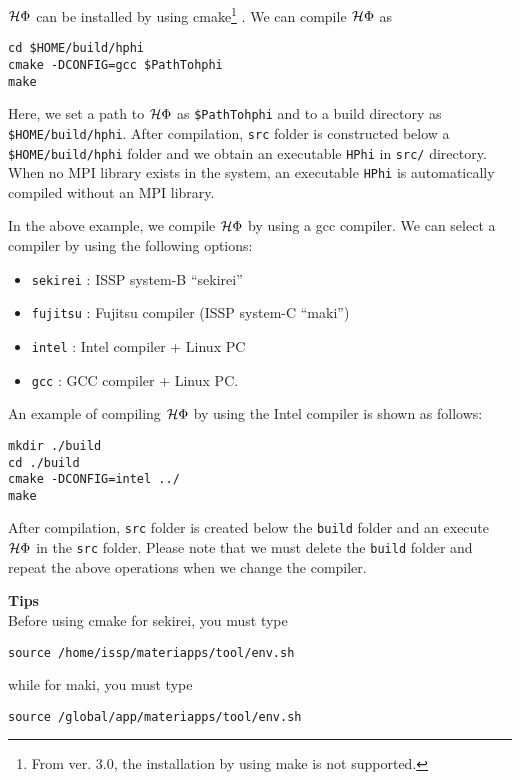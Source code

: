 $\mathcal{H} \Phi$ can be installed by using cmake\footnote{From ver. 3.0, the installation by using make is not supported.}
.
We can compile $\mathcal{H} \Phi$ as
\begin{verbatim}
cd $HOME/build/hphi
cmake -DCONFIG=gcc $PathTohphi
make
\end{verbatim}
Here, we set a path to $\mathcal{H} \Phi$ as \verb|$PathTohphi|
and to a build directory as \verb| $HOME/build/hphi|.
After compilation, \verb|src| folder is constructed below a \verb|$HOME/build/hphi|
folder and we obtain an executable \verb|HPhi| in \verb|src/| directory.
When no MPI library exists in the system, an executable \verb|HPhi|
is automatically compiled without an MPI library.

In the above example,
we compile $\mathcal{H} \Phi$ by using a gcc compiler.
We can select a compiler by using the following options:
\begin{itemize}
\item \verb|sekirei| : ISSP system-B ``sekirei''
\item \verb|fujitsu| : Fujitsu compiler (ISSP system-C ``maki'')
\item \verb|intel| : Intel compiler + Linux PC
\item \verb|gcc| : GCC compiler + Linux PC.
\end{itemize}
An example of compiling $\mathcal{H} \Phi$ by using the Intel compiler is shown as follows:
\begin{verbatim}
mkdir ./build
cd ./build
cmake -DCONFIG=intel ../
make
\end{verbatim}
After compilation,
\verb|src| folder is created below the \verb|build| folder and
an execute $\mathcal{H} \Phi$ in the \verb|src| folder.
Please note that we must delete the \verb|build| folder and
repeat the above operations when we change the compiler.

\begin{screen}
\Large 
{\bf Tips}
\normalsize\\
Before using cmake for sekirei, you must type 
\begin{verbatim}
source /home/issp/materiapps/tool/env.sh
\end{verbatim}
while for maki, you must type
\begin{verbatim}
source /global/app/materiapps/tool/env.sh
\end{verbatim}
\end{screen}

\label{Sec:HowToInstall}


